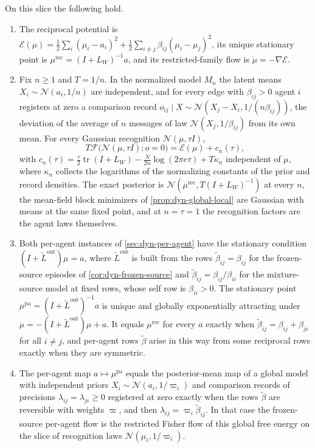 On this slice the following hold.
\begin{enumerate}
\item[(i)] The reciprocal potential is $\mathcal E(\mu)=\frac12\sum_i(\mu_i-a_i)^2+\frac12\sum_{i\neq j}\beta_{ij}(\mu_i-\mu_j)^2$, its unique stationary point is $\mu^{\mathrm{rec}}=(I+L_W)^{-1}a$, and its restricted-family flow is $\dot\mu=-\nabla\mathcal E$.
\item[(ii)] Fix $n\geq1$ and $T=1/n$. In the normalized model $M_n$ the latent means $X_i\sim\mathcal N(a_i,1/n)$ are independent, and for every edge with $\beta_{ij}>0$ agent $i$ registers at zero a comparison record $o_{ij}\mid X\sim\mathcal N(X_j-X_i,1/(n\beta_{ij}))$, the deviation of the average of $n$ messages of law $\mathcal N(X_j,1/\beta_{ij})$ from its own mean. For every Gaussian recognition $\mathcal N(\mu,\tau I)$,
\begin{equation}
 T\mathcal F\bigl(\mathcal N(\mu,\tau I);o=0\bigr)=\mathcal E(\mu)+c_n(\tau),
 \label{eq:dyn-three-limits}
\end{equation}
with $c_n(\tau)=\frac\tau2\operatorname{tr}(I+L_W)-\frac{N}{2n}\log(2\pi e\tau)+T\kappa_n$ independent of $\mu$, where $\kappa_n$ collects the logarithms of the normalizing constants of the prior and record densities. The exact posterior is $\mathcal N(\mu^{\mathrm{rec}},T(I+L_W)^{-1})$ at every $n$, the mean-field block minimizers of \cref{prop:dyn-global-local} are Gaussian with means at the same fixed point, and at $n=\tau=1$ the recognition factors are the agent laws themselves.
\item[(iii)] Both per-agent instances of \cref{sec:dyn-per-agent} have the stationary condition $(I+\tilde L^{\mathrm{out}})\mu=a$, where $\tilde L^{\mathrm{out}}$ is built from the rows $\tilde\beta_{ij}=\beta_{ij}$ for the frozen-source episodes of \cref{cor:dyn-frozen-source} and $\tilde\beta_{ij}=\beta_{ij}/\beta_{ii}$ for the mixture-source model at fixed rows, whose self row is $\beta_{ii}>0$. The stationary point $\mu^{\mathrm{pa}}=(I+\tilde L^{\mathrm{out}})^{-1}a$ is unique and globally exponentially attracting under $\dot\mu=-(I+\tilde L^{\mathrm{out}})\mu+a$. It equals $\mu^{\mathrm{rec}}$ for every $a$ exactly when $\tilde\beta_{ij}=\beta_{ij}+\beta_{ji}$ for all $i\neq j$, and per-agent rows $\tilde\beta$ arise in this way from some reciprocal rows exactly when they are symmetric.
\item[(iv)] The per-agent map $a\mapsto\mu^{\mathrm{pa}}$ equals the posterior-mean map of a global model with independent priors $X_i\sim\mathcal N(a_i,1/\varpi_i)$ and comparison records of precisions $\lambda_{ij}=\lambda_{ji}\geq0$ registered at zero exactly when the rows $\tilde\beta$ are reversible with weights $\varpi$, and then $\lambda_{ij}=\varpi_i\tilde\beta_{ij}$. In that case the frozen-source per-agent flow is the restricted Fisher flow of this global free energy on the slice of recognition laws $\mathcal N(\mu_i,1/\varpi_i)$.
\end{enumerate}
